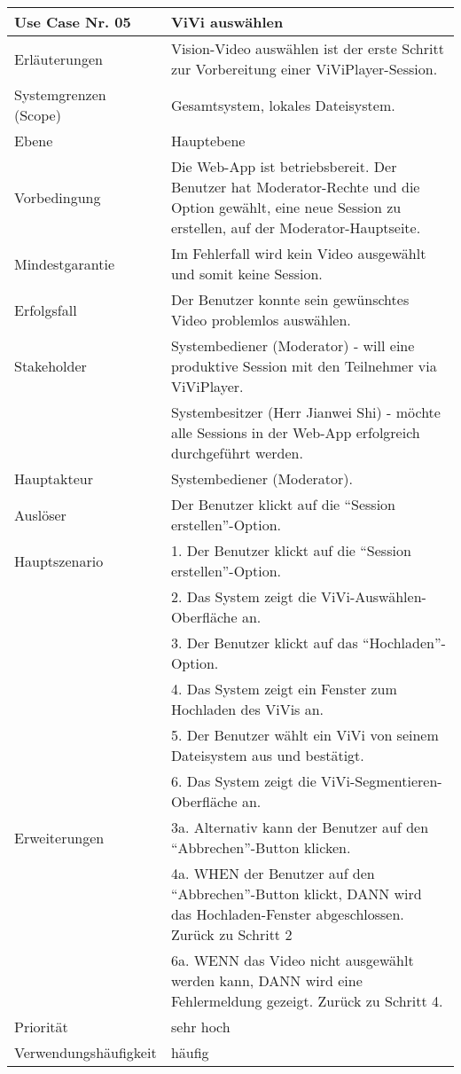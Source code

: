 \begin{tabularx}{\linewidth}{|l|X|}
	\hline
	Use Case Nr. 05			& \textbf{ViVi auswählen} \\ \hline
	Erläuterungen			& Vision-Video auswählen ist der erste Schritt zur Vorbereitung 
							  einer ViViPlayer-Session. \\ \hline
	Systemgrenzen (Scope)	& Gesamtsystem, lokales Dateisystem. \\ \hline
	Ebene					& Hauptebene \\ \hline
	Vorbedingung			& Die Web-App ist betriebsbereit. Der Benutzer hat 
							  Moderator-Rechte und die Option gewählt, eine neue Session zu 
							  erstellen, auf der Moderator-Hauptseite. \\ \hline
	Mindestgarantie			& Im Fehlerfall wird kein Video ausgewählt und somit keine 
							  Session.\\ \hline
	Erfolgsfall 			& Der Benutzer konnte sein gewünschtes Video problemlos auswählen. 
							  \\ \hline
	Stakeholder				& Systembediener (Moderator) - will eine produktive Session mit den 
							  Teilnehmer via ViViPlayer. \\
							& Systembesitzer (Herr Jianwei Shi) - möchte alle Sessions in der 
							  Web-App erfolgreich durchgeführt werden. \\ \hline
	Hauptakteur				& Systembediener (Moderator). \\ \hline
	Auslöser				& Der Benutzer klickt auf die ``Session erstellen''-Option. \\ \hline	
	Hauptszenario			& 1. Der Benutzer klickt auf die ``Session erstellen''-Option. \\
							& 2. Das System zeigt die ViVi-Auswählen-Oberfläche an. \\
							& 3. Der Benutzer klickt auf das ``Hochladen''-Option. \\
							& 4. Das System zeigt ein Fenster zum Hochladen des ViVis an. \\
							& 5. Der Benutzer wählt ein ViVi von seinem Dateisystem aus und 
							  bestätigt. \\
							& 6. Das System zeigt die ViVi-Segmentieren-Oberfläche an. \\ \hline
	Erweiterungen			& 3a. Alternativ kann der Benutzer auf den ``Abbrechen''-Button klicken. \\
							& 4a. WHEN der Benutzer auf den ``Abbrechen''-Button klickt, DANN wird das 
							  Hochladen-Fenster abgeschlossen. Zurück zu Schritt 2  \\
							& 6a. WENN das Video nicht ausgewählt werden kann, DANN wird eine 
							  Fehlermeldung gezeigt. Zurück zu Schritt 4. \\ \hline
	Priorität				& sehr hoch \\ \hline
	Verwendungshäufigkeit	& häufig \\ \hline
\end{tabularx}